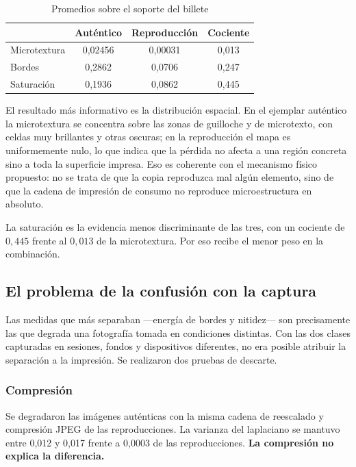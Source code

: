\documentclass[conference]{IEEEtran}
\begin{document}
\begin{table}[h]
\centering
\caption{Promedios sobre el soporte del billete}
\label{tab:saliencia}
\small
\begin{tabular}{@{}lccc@{}}
\toprule
 & \textbf{Auténtico} & \textbf{Reproducción} & \textbf{Cociente} \\
\midrule
Microtextura & 0{,}02456 & 0{,}00031 & 0{,}013 \\
Bordes       & 0{,}2862  & 0{,}0706  & 0{,}247 \\
Saturación   & 0{,}1936  & 0{,}0862  & 0{,}445 \\
\bottomrule
\end{tabular}
\end{table}

El resultado más informativo es la distribución espacial. En el
ejemplar auténtico la microtextura se concentra sobre las zonas de
guilloche y de microtexto, con celdas muy brillantes y otras oscuras;
en la reproducción el mapa es uniformemente nulo, lo que indica que la
pérdida no afecta a una región concreta sino a toda la superficie
impresa. Eso es coherente con el mecanismo físico propuesto: no se
trata de que la copia reproduzca mal algún elemento, sino de que la
cadena de impresión de consumo no reproduce microestructura en
absoluto.

La saturación es la evidencia menos discriminante de las tres, con un
cociente de $0{,}445$ frente al $0{,}013$ de la microtextura. Por eso
recibe el menor peso en la combinación.

\subsection{El problema de la confusión con la captura}
\label{sec:pareado}

Las medidas que más separaban ---energía de bordes y nitidez--- son
precisamente las que degrada una fotografía tomada en condiciones
distintas. Con las dos clases capturadas en sesiones, fondos y
dispositivos diferentes, no era posible atribuir la separación a la
impresión. Se realizaron dos pruebas de descarte.

\subsubsection{Compresión}
Se degradaron las imágenes auténticas con la misma cadena de reescalado
y compresión JPEG de las reproducciones. La varianza del laplaciano se
mantuvo entre 0{,}012 y 0{,}017 frente a 0{,}0003 de las
reproducciones. \textbf{La compresión no explica la diferencia.}
\end{document}
